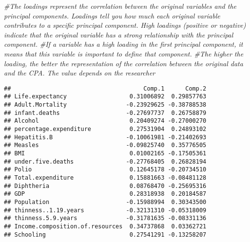 \documentclass[
]{article}
\newenvironment{Shaded}{\begin{snugshade}}{\end{snugshade}}
\newcommand{\CommentTok}[1]{\textcolor[rgb]{0.56,0.35,0.01}{\textit{#1}}}
\newcommand{\DecValTok}[1]{\textcolor[rgb]{0.00,0.00,0.81}{#1}}
\newcommand{\DocumentationTok}[1]{\textcolor[rgb]{0.56,0.35,0.01}{\textbf{\textit{#1}}}}
\newcommand{\NormalTok}[1]{#1}
\newcommand{\SpecialCharTok}[1]{\textcolor[rgb]{0.81,0.36,0.00}{\textbf{#1}}}
\begin{document}
\begin{Shaded}
\begin{Highlighting}[]
\CommentTok{\#The loadings represent the correlation between the original variables and the principal components. Loadings tell you how much each original variable contributes to a specific principal component. High loadings (positive or negative) indicate that the original variable has a strong relationship with the principal component. }
\CommentTok{\#If a variable has a high loading in the first principal component, it means that this variable is important to define that component.}
\CommentTok{\#The higher the loading, the better the representation of the correlation between the original data and the CPA. The value depends on the researcher}
\end{Highlighting}
\end{Shaded}

\begin{Shaded}
\end{Shaded}

\begin{verbatim}
##                                      Comp.1      Comp.2
## Life.expectancy                  0.31006892  0.29857763
## Adult.Mortality                 -0.23929625 -0.38788538
## infant.deaths                   -0.27697737  0.26758879
## Alcohol                          0.20409274 -0.27000270
## percentage.expenditure           0.27531904  0.24893102
## Hepatitis.B                     -0.10061981 -0.21402693
## Measles                         -0.09825740  0.35776505
## BMI                              0.01002165 -0.17505361
## under.five.deaths               -0.27768405  0.26828194
## Polio                            0.12645178 -0.20734510
## Total.expenditure                0.15881663 -0.08481128
## Diphtheria                       0.08768470 -0.25695316
## GDP                              0.28318938  0.20184587
## Population                      -0.15988994  0.30343500
## thinness..1.19.years            -0.32131310 -0.05318009
## thinness.5.9.years              -0.31781635 -0.08331136
## Income.composition.of.resources  0.34737868  0.03362721
## Schooling                        0.27541291 -0.13258207
\end{verbatim}
\end{document}

